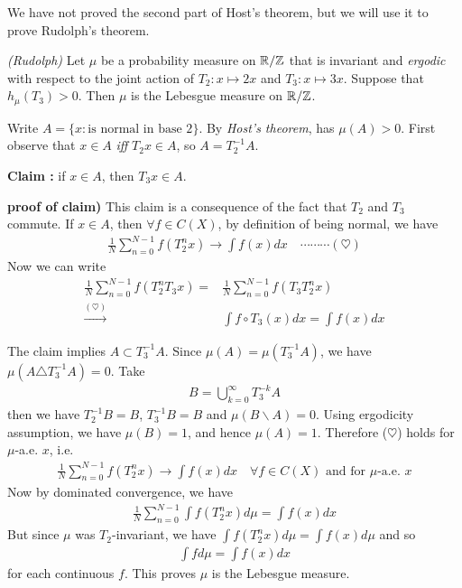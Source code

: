 \documentclass[12pt,a4paper]{report}
\newenvironment{proof}
{\begin{changemargin}{1cm}{0.5cm} 
	}%
	{\end{changemargin}
}
\newenvironment{subproof}
{\begin{changemargin}{0.5cm}{0.5cm}
	}%
	{\end{changemargin}
}
\begin{document}
\s

We have not proved the second part of Host's theorem, but we will use it to prove Rudolph's theorem.
\s

\thm \emph{(Rudolph)} Let $\mu$ be a probability measure on $\mathbb{R}/ \mathbb{Z}$ that is invariant and \emph{ergodic} with respect to the joint action of $T_2 : x \mapsto 2x$ and $T_3 : x\mapsto 3x$. Suppose that $h_{\mu}(T_3) >0$. Then $\mu$ is the Lebesgue measure on $\mathbb{R}/\mathbb{Z}$.
\begin{proof}
\pf Write $A = \{ x: \text{is normal in base 2}\}$. By \emph{Host's theorem}, has $\mu(A)>0$. First observe that $x\in A$ \emph{iff} $T_2 x \in A$, so $A = T_2^{-1} A$.
\s

\textbf{Claim :} if $x\in A$, then $T_3 x\in A$.
\begin{subproof}
\textbf{proof of claim)} This claim is a consequence of the fact that $T_2$ and $T_3$ commute. If $x\in A$, then $\forall f \in C(X)$, by definition of being normal, we have
\begin{align*}
\frac{1}{N} \sum_{n=0}^{N-1} f(T_2^n x) \rightarrow \int f(x)dx \quad \cdots\cdots\cdots (\heartsuit)
\end{align*}
Now we can write
\begin{align*}
\frac{1}{N} \sum_{n=0}^{N-1} f(T_2^n T_3 x) =& \frac{1}{N} \sum_{n=0}^{N-1} f(T_3 T_2^n x) \\
\xrightarrow{(\heartsuit)} & \int f \circ T_3 (x) dx = \int f(x)dx
\end{align*}
\end{subproof}
The claim implies $A \subset T_3^{-1} A$. Since $\mu(A) = \mu(T_3^{-1} A)$, we have $\mu(A \triangle T_3^{-1}A) =0$. Take
\begin{align*}
B = \bigcup_{k=0}^{\infty} T_3^{-k} A
\end{align*}
then we have $T_2^{-1}B= B$, $T_3^{-1} B = B$ and $\mu(B \backslash A) =0$. Using ergodicity assumption, we have $\mu(B) =1$, and hence $\mu(A)=1$. Therefore ($\heartsuit$) holds for $\mu$-a.e. $x$, i.e.
\begin{align*}
\frac{1}{N} \sum_{n=0}^{N-1} f(T^n_2 x) \rightarrow \int f(x) dx \quad \forall f\in C(X) \text{ and for } \mu \text{-a.e. }x
\end{align*}
Now by dominated convergence, we have
\begin{align*}
\frac{1}{N} \sum_{n=0}^{N-1} \int f(T_2^n x) d\mu = \int f(x) dx
\end{align*}
But since $\mu$ was $T_2$-invariant, we have $\int f(T_2^n x)d\mu = \int f(x) d\mu$ and so 
\begin{align*}
\int f d\mu = \int f(x)dx
\end{align*}
for each continuous $f$. This proves $\mu$ is the Lebesgue measure.
\s

\eop
\end{proof}
\end{document}
